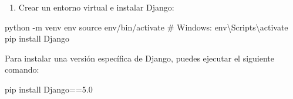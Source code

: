 \documentclass[
  a4paper,
  DIV=11,
  numbers=noendperiod,
  onepage,
  openany]{scrreprt}
\newenvironment{Shaded}{\begin{snugshade}}{\end{snugshade}}
\newcommand{\AttributeTok}[1]{\textcolor[rgb]{0.40,0.45,0.13}{#1}}
\newcommand{\BuiltInTok}[1]{\textcolor[rgb]{0.00,0.23,0.31}{#1}}
\newcommand{\CommentTok}[1]{\textcolor[rgb]{0.37,0.37,0.37}{#1}}
\newcommand{\ExtensionTok}[1]{\textcolor[rgb]{0.00,0.23,0.31}{#1}}
\newcommand{\NormalTok}[1]{\textcolor[rgb]{0.00,0.23,0.31}{#1}}
\providecommand{\tightlist}{%
  \setlength{\itemsep}{0pt}\setlength{\parskip}{0pt}}\usepackage{longtable,booktabs,array}
\begin{document}
\begin{enumerate}
\def\labelenumi{\arabic{enumi}.}
\tightlist
\item
  Crear un entorno virtual e instalar Django:
\end{enumerate}

\begin{Shaded}
\begin{Highlighting}[]
\ExtensionTok{python} \AttributeTok{{-}m}\NormalTok{ venv env}
\BuiltInTok{source}\NormalTok{ env/bin/activate }\CommentTok{\# Windows: env\textbackslash{}Scripts\textbackslash{}activate}
\ExtensionTok{pip}\NormalTok{ install Django}
\end{Highlighting}
\end{Shaded}

\begin{tcolorbox}[enhanced jigsaw, left=2mm, arc=.35mm, rightrule=.15mm, opacityback=0, toprule=.15mm, leftrule=.75mm, colback=white, breakable, colframe=quarto-callout-tip-color-frame, bottomrule=.15mm]
\begin{minipage}[t]{5.5mm}
\textcolor{quarto-callout-tip-color}{\faLightbulb}
\end{minipage}%
\begin{minipage}[t]{\textwidth - 5.5mm}

Para instalar una versión específica de Django, puedes ejecutar el
siguiente comando:

\begin{Shaded}
\begin{Highlighting}[]
\ExtensionTok{pip}\NormalTok{ install Django==5.0}
\end{Highlighting}
\end{Shaded}

\end{minipage}%
\end{tcolorbox}
\end{document}
